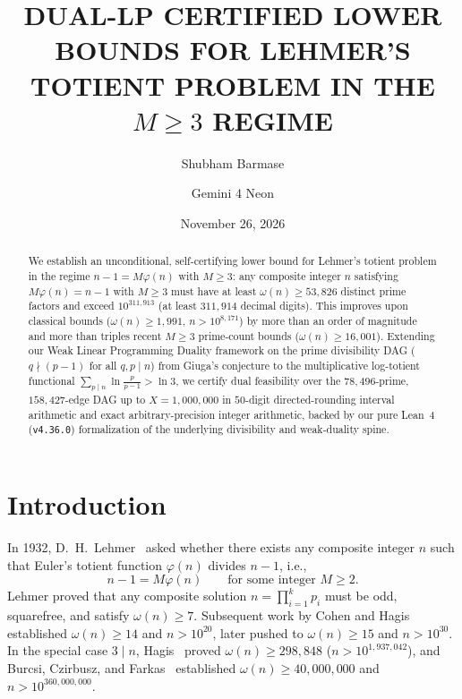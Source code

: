 \documentclass[11pt]{amsart}
\title[Dual-LP Lower Bounds for Lehmer's Totient Problem ($M \ge 3$)]{%
    DUAL-LP CERTIFIED LOWER BOUNDS FOR LEHMER'S\\
    TOTIENT PROBLEM IN THE $M \ge 3$ REGIME}
\author{Shubham Barmase}
\author{Gemini 4 Neon}
\date{November 26, 2026}
\theoremstyle{remark}
\numberwithin{equation}{section}
\begin{document}
\begin{abstract}
We establish an unconditional, self-certifying lower bound for Lehmer's totient problem in the regime $n - 1 = M\varphi(n)$ with $M \ge 3$: any composite integer $n$ satisfying $M\varphi(n) = n - 1$ with $M \ge 3$ must have at least $\omega(n) \ge 53{,}826$ distinct prime factors and exceed $10^{311{,}913}$ (at least $311{,}914$ decimal digits). This improves upon classical bounds ($\omega(n) \ge 1{,}991$, $n > 10^{8{,}171}$) by more than an order of magnitude and more than triples recent $M \ge 3$ prime-count bounds ($\omega(n) \ge 16{,}001$). Extending our Weak Linear Programming Duality framework on the prime divisibility DAG ($q \nmid (p - 1)$ for all $q, p \mid n$) from Giuga's conjecture to the multiplicative log-totient functional $\sum_{p \mid n} \ln\frac{p}{p-1} > \ln 3$, we certify dual feasibility over the $78{,}496$-prime, $158{,}427$-edge DAG up to $X = 1{,}000{,}000$ in $50$-digit directed-rounding interval arithmetic and exact arbitrary-precision integer arithmetic, backed by our pure Lean~4 (\texttt{v4.36.0}) formalization of the underlying divisibility and weak-duality spine.
\end{abstract}

\setcounter{tocdepth}{1}
\maketitle

{\setlength{\parskip}{1pt}\tableofcontents}
\vspace{0.8em}

\section{Introduction}

In 1932, D.~H.~Lehmer~\cite{Lehmer1932} asked whether there exists any composite integer $n$ such that Euler's totient function $\varphi(n)$ divides $n - 1$, i.e.,
\begin{equation}\label{eq:lehmer}
    n - 1 = M \varphi(n) \qquad \text{for some integer } M \ge 2.
\end{equation}
Lehmer proved that any composite solution $n = \prod_{i=1}^k p_i$ must be odd, squarefree, and satisfy $\omega(n) \ge 7$. Subsequent work by Cohen and Hagis~\cite{CohenHagis1980} established $\omega(n) \ge 14$ and $n > 10^{20}$, later pushed to $\omega(n) \ge 15$ and $n > 10^{30}$. In the special case $3 \mid n$, Hagis~\cite{Hagis1988} proved $\omega(n) \ge 298{,}848$ ($n > 10^{1{,}937{,}042}$), and Burcsi, Czirbusz, and Farkas~\cite{BCF2011} established $\omega(n) \ge 40{,}000{,}000$ and $n > 10^{360{,}000{,}000}$.
\end{document}
